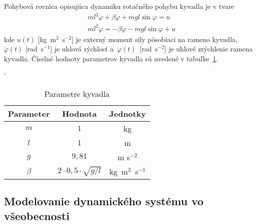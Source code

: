 \documentclass[a4paper, 10pt, ]{article}
\begin{document}
\begin{center}

	\vspace{-9mm}

	\label{Kyvadlo}

	\vspace{-3mm}
\end{center}


Pohybová rovnica opisujúca dynamiku rotačného pohybu kyvadla je v tvare
\begin{subequations} \label{PohRovKyvadla}
\begin{align}
		&ml^2 \ddot{\varphi} + \beta \dot{\varphi} + mgl\sin{\varphi} = u \label{PohRovKyvadlab} \\
		&ml^2 \ddot{\varphi} = -\beta \dot{\varphi} - mgl\sin{\varphi} + u
\end{align}
\end{subequations}
kde $u(t)$ [kg~m$^2$~s$^{-2}$] je externý moment sily pôsobiaci na rameno kyvadla, $\dot{\varphi}(t)$ [rad~s$^{-1}$] je uhlová rýchlosť a~$\ddot{\varphi}(t)$~[rad~s$^{-2}$] je uhlové zrýchlenie ramena kyvadla. Číselné hodnoty parametrov kyvadla sú uvedené v tabuľke~\ref{Parametre kyvadla}.



\begin{table}[b]
	\centering
	\catcode`


\caption{Parametre kyvadla}
\label{Parametre kyvadla}
\begin{tabular}{     c    c   c       }
\toprule
Parameter   & Hodnota    & Jednotky              \\
\midrule
$m$       & $1$   & kg             \\
$l$    &  $1$  & m \\
$g$   & $9,81$  & m s$^{-2}$ \\
$\beta$  &  $2 \cdot 0,5 \cdot \sqrt{g/l}$ &  kg~m$^2$~s$^{-1}$ \\
\bottomrule
\end{tabular}
\end{table}







\subsection{Modelovanie dynamického systému vo všeobecnosti}
\end{document}
